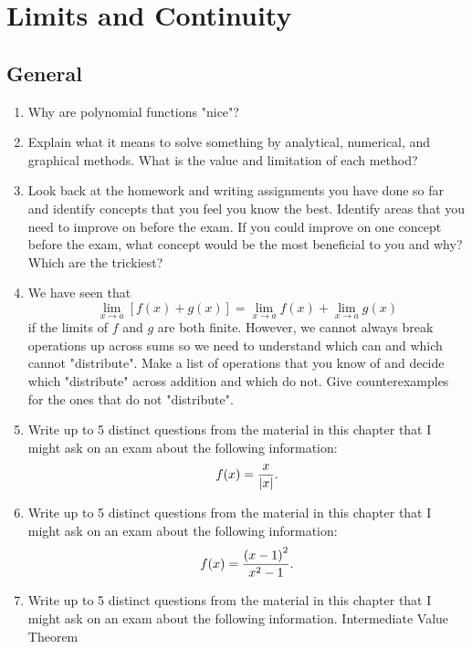 \chapter{Limits and Continuity}  

 \section{General}  \begin{enumerate}  

\item  Why are polynomial functions "nice"? 

\item  Explain what it means to solve something by analytical, numerical, and graphical methods.  What is the value and limitation of each method? 

\item  Look back at the homework and writing assignments you have done so far and identify concepts that you feel you know the best.  Identify areas that you need to improve on before the exam.  If you could improve on one concept before the exam, what concept would be the most beneficial to you and why? Which are the trickiest? 

\item  We have seen that $$\mathop {\lim }\limits_{x \to a} \left[ {f\left( x \right) + g\left( x \right)} \right] = \mathop {\lim }\limits_{x \to a} f\left( x \right) + \mathop {\lim }\limits_{x \to a} g\left( x \right)$$ if the limits of $f$ and $g$ are both finite.  However, we cannot always break operations up across sums so we need to understand which can and which cannot "distribute".  Make a list of operations that you know of and decide which "distribute" across addition and which do not.  Give counterexamples for the ones that do not "distribute". 

\item  Write up to 5 distinct questions from the material in this chapter that I might ask on an exam about the following information:  $$f(x) = {x \over {\left| x \right|}}.$$

\item  Write up to 5 distinct questions from the material in this chapter that I might ask on an exam about the following information:  $$f(x) = {{\left( {x - 1} \right)^2 } \over {x^2  - 1}}.$$

\item  Write up to 5 distinct questions from the material in this chapter that I might ask on an exam about the following information.
Intermediate Value Theorem 


\end{enumerate}
